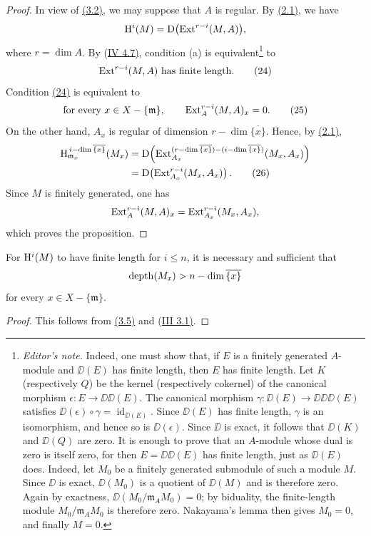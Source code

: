 \begin{proof}
\renewcommand{\qedsymbol}{}
In view of \textup{\hyperref[V.3.2]{(3.2)}}, we may suppose that $A$ is regular. By
\textup{\hyperref[V.2.1]{(2.1)}}, we have
\[
  \mathrm H^i(M)=\mathrm D\bigl(\operatorname{Ext}^{r-i}(M,A)\bigr),
\]
where $r=\dim A$. By \textup{(\hyperref[IV.4.7]{IV 4.7)}}, condition \textup{(a)} is
equivalent\footnote{\textit{Editor's note.} Indeed, one must show that, if $E$ is a finitely generated
$A$-module and $\DD(E)$ has finite length, then $E$ has finite length. Let $K$
(respectively $Q$) be the kernel (respectively cokernel) of the canonical
morphism $\epsilon\colon E\to\DD\DD(E)$. The canonical morphism
$\gamma\colon\DD(E)\to\DD\DD\DD(E)$ satisfies
$\DD(\epsilon)\circ\gamma=\operatorname{id}_{\DD(E)}$. Since $\DD(E)$ has
finite length, $\gamma$ is an isomorphism, and hence so is
$\DD(\epsilon)$. Since $\DD$ is exact, it follows that $\DD(K)$ and
$\DD(Q)$ are zero. It is enough to prove that an $A$-module whose dual is zero
is itself zero, for then $E=\DD\DD(E)$ has finite length, just as $\DD(E)$
does. Indeed, let $M_0$ be a finitely generated submodule of such a module
$M$. Since $\DD$ is exact, $\DD(M_0)$ is a quotient of $\DD(M)$ and is
therefore zero. Again by exactness,
$\DD(M_0/\mathfrak m_A M_0)=0$; by biduality, the finite-length module
$M_0/\mathfrak m_A M_0$ is therefore zero. Nakayama's lemma then gives
$M_0=0$, and finally $M=0$.} to
\begin{equation}
  \operatorname{Ext}^{r-i}(M,A)\text{ has finite length}. \tag{24}\label{eq:V.24}
\end{equation}
Condition \textup{\hyperref[eq:V.24]{(24)}} is equivalent to
\begin{equation}
  \text{for every }x\in X-\{\mathfrak m\},\qquad
  \operatorname{Ext}_A^{r-i}(M,A)_x=0. \tag{25}\label{eq:V.25}
\end{equation}
On the other hand, $A_x$ is regular of dimension
$r-\dim\overline{\{x\}}$. Hence, by \textup{\hyperref[V.2.1]{(2.1)}},
\begin{align}
  \mathrm H_{\mathfrak m_x}^{\,i-\dim\overline{\{x\}}}(M_x)
  &={\mathrm D}\!\left(
    \operatorname{Ext}_{A_x}^{(r-\dim\overline{\{x\}})
      -(i-\dim\overline{\{x\}})}(M_x,A_x)
  \right) \notag\\
  &={\mathrm D}\!\left(\operatorname{Ext}_{A_x}^{r-i}(M_x,A_x)\right). \tag{26}\label{eq:V.26}
\end{align}
Since $M$ is finitely generated, one has
\[
  \operatorname{Ext}_A^{r-i}(M,A)_x
  =\operatorname{Ext}_{A_x}^{r-i}(M_x,A_x),
\]
which proves the proposition.
\end{proof}

\begin{sgacorollary}
For $\mathrm H^i(M)$ to have finite length for $i\leq n$, it is necessary and
sufficient that
\[
  \operatorname{depth}(M_x)>n-\dim\overline{\{x\}}
\]
for every $x\in X-\{\mathfrak m\}$.
\end{sgacorollary}

\begin{proof}
\renewcommand{\qedsymbol}{}
This follows from \textup{\hyperref[V.3.5]{(3.5)}} and \textup{(\hyperref[III.3.1]{III 3.1)}}.
\end{proof}
